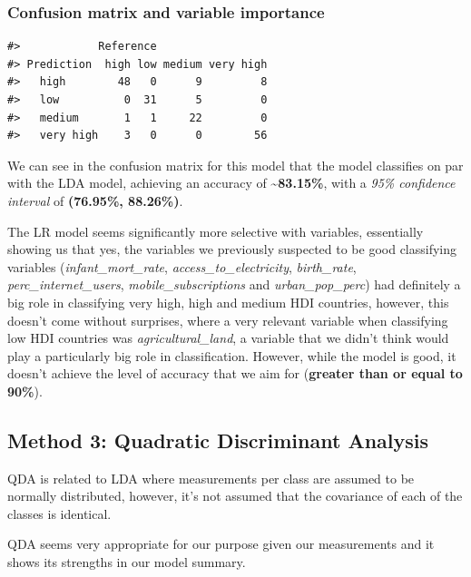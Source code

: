 \documentclass[]{article}
\begin{document}
\hypertarget{confusion-matrix-and-variable-importance-1}{%
\subsubsection{Confusion matrix and variable
importance}\label{confusion-matrix-and-variable-importance-1}}

\footnotesize

\begin{verbatim}
#>            Reference
#> Prediction  high low medium very high
#>   high        48   0      9         8
#>   low          0  31      5         0
#>   medium       1   1     22         0
#>   very high    3   0      0        56
\end{verbatim}

\normalsize

We can see in the confusion matrix for this model that the model
classifies on par with the LDA model, achieving an accuracy of
\textbf{\textasciitilde{}83.15\%}, with a \emph{95\% confidence
interval} of \textbf{(76.95\%, 88.26\%)}.

The LR model seems significantly more selective with variables,
essentially showing us that yes, the variables we previously suspected
to be good classifying variables (\emph{infant\_mort\_rate},
\emph{access\_to\_electricity}, \emph{birth\_rate},
\emph{perc\_internet\_users}, \emph{mobile\_subscriptions} and
\emph{urban\_pop\_perc}) had definitely a big role in classifying very
high, high and medium HDI countries, however, this doesn't come without
surprises, where a very relevant variable when classifying low HDI
countries was \emph{agricultural\_land}, a variable that we didn't think
would play a particularly big role in classification. However, while the
model is good, it doesn't achieve the level of accuracy that we aim for
(\textbf{greater than or equal to 90\%}).

\hypertarget{method-3-quadratic-discriminant-analysis}{%
\subsection{Method 3: Quadratic Discriminant
Analysis}\label{method-3-quadratic-discriminant-analysis}}

QDA is related to LDA where measurements per class are assumed to be
normally distributed, however, it's not assumed that the covariance of
each of the classes is identical.

QDA seems very appropriate for our purpose given our measurements and it
shows its strengths in our model summary.
\end{document}
